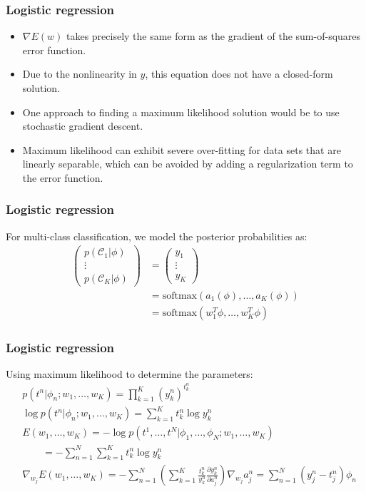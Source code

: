\documentclass{beamer}
\begin{document}
\begin{frame}
    \frametitle{Logistic regression}
    \begin{itemize}
        \item $\nabla{}E(w)$ takes precisely the same form as the gradient of the sum-of-squares error function.
        \item Due to the nonlinearity in $y$, this equation does not have a closed-form solution.
        \item One approach to finding a maximum likelihood solution would be to use stochastic gradient descent.
        \item Maximum likelihood can exhibit severe over-fitting for data sets that are linearly separable, which can be avoided by adding a regularization term to the error function.
    \end{itemize}
\end{frame}

\begin{frame}
    \frametitle{Logistic regression}
    For multi-class classification, we model the posterior probabilities as:
    \begin{align*}
        \begin{pmatrix}
            p(\mathcal{C}_{1}|\phi) \\
            \vdots \\
            p(\mathcal{C}_{K}|\phi)
        \end{pmatrix}&=
        \begin{pmatrix}
            y_{1} \\
            \vdots \\
            y_{K}
        \end{pmatrix} \\
        &=\mathrm{softmax}(a_{1}(\phi),\hdots,a_{K}(\phi)) \\
        &=\mathrm{softmax}(w_{1}^{T}\phi,\hdots,w_{K}^{T}\phi)
    \end{align*}
\end{frame}

\begin{frame}
    \frametitle{Logistic regression}
    Using maximum likelihood to determine the parameters:
    \begin{align*}
        &p(t^{n}|\phi_{n};w_{1},\hdots,w_{K})=\prod_{k=1}^{K}(y^{n}_{k})^{t^{n}_{k}} \\
        &\log{}p(t^{n}|\phi_{n};w_{1},\hdots,w_{K})=\sum_{k=1}^{K}t^{n}_{k}\log{}y^{n}_{k} \\
        &E(w_{1},\hdots,w_{K})=-\log{}p(t^{1},\hdots,t^{N}|\phi_{1},\hdots,\phi_{N};w_{1},\hdots,w_{K}) \\
        &\qquad=-\sum_{n=1}^{N}\sum_{k=1}^{K}t^{n}_{k}\log{}y^{n}_{k} \\
        &\nabla_{w_{j}}E(w_{1},\hdots,w_{K})=-\sum_{n=1}^{N}(\sum_{k=1}^{K}\frac{t^{n}_{k}}{y^{n}_{k}}\frac{\partial{}y^{n}_{k}}{\partial{}a^{n}_{j}})\nabla_{w_{j}}a^{n}_{j}=\sum_{n=1}^{N}(y^{n}_{j}-t^{n}_{j})\phi_{n}
    \end{align*}
\end{frame}
\end{document}
